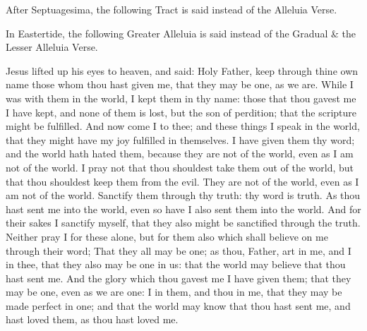 \begin{rubric}
    After Septuagesima, the following Tract is said instead of the Alleluia Verse.
\end{rubric}


\begin{rubric}
    In Eastertide, the following Greater Alleluia is said instead of the Gradual \& the Lesser Alleluia Verse.
\end{rubric}


 Jesus lifted up his eyes to heaven, and said: Holy Father, keep through thine own name those whom thou hast given me, that they may be one, as we are. While I was with them in the world, I kept them in thy name: those that thou gavest me I have kept, and none of them is lost, but the son of perdition; that the scripture might be fulfilled. And now come I to thee; and these things I speak in the world, that they might have my joy fulfilled in themselves. I have given them thy word; and the world hath hated them, because they are not of the world, even as I am not of the world. I pray not that thou shouldest take them out of the world, but that thou shouldest keep them from the evil. They are not of the world, even as I am not of the world. Sanctify them through thy truth: thy word is truth. As thou hast sent me into the world, even so have I also sent them into the world. And for their sakes I sanctify myself, that they also might be sanctified through the truth. Neither pray I for these alone, but for them also which shall believe on me through their word; That they all may be one; as thou, Father, art in me, and I in thee, that they also may be one in us: that the world may believe that thou hast sent me. And the glory which thou gavest me I have given them; that they may be one, even as we are one: I in them, and thou in me, that they may be made perfect in one; and that the world may know that thou hast sent me, and hast loved them, as thou hast loved me.


